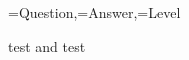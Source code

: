 \documentclass{article}
\newcounter{maxleveli}
\newcounter{maxlevelii}
\newcounter{leveli}
\newcounter{levelii}
\begin{document}
\begin{enumerate}
  {\Question=Question,\Answer=Answer,\Level=Level}%
  {%
    \ifnumgreater
      {\value{level\romannumeral\Level}}%
      {\value{maxlevel\romannumeral\Level}}%
    {}%
    {\item \Question

     \ifdefempty\Answer
     {}%
     {%
       \iftoggle{showanswers}{Answer: \Answer}{}%
     }%
    }%
    \ifboolexpr
    {%
      test{\ifnumgreater{\value{leveli}}{\value{maxleveli}}}
      and
      test{\ifnumgreater{\value{levelii}}{\value{maxlevelii}}}
    }%
    {\dtlbreak}{}%
  }
\end{enumerate}
\end{document}
